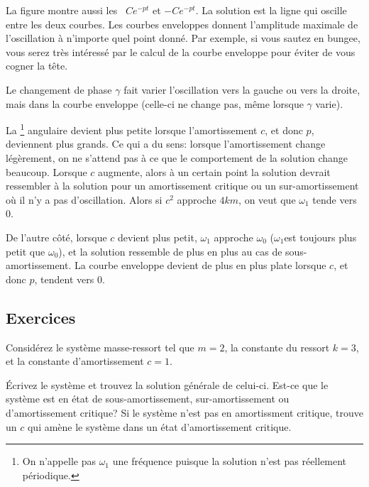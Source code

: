 
La figure montre aussi les~\emph{}
$C e^{-pt}$ et $-C e^{-pt}$.  La solution est la ligne qui oscille entre les deux courbes. Les courbes enveloppes donnent l'amplitude maximale de l'oscillation à n'importe quel point donné. Par exemple, si vous sautez en bungee, vous serez très intéressé par le calcul de la courbe enveloppe pour éviter de vous cogner la tête. 

Le changement de phase $\gamma$ fait varier l'oscillation vers la gauche ou vers la droite, mais dans la courbe enveloppe (celle-ci ne change pas, même lorsque $\gamma$
varie).


La 
\emph{}\footnote{On n'appelle pas $\omega_1$ une fréquence puisque la solution n'est pas réellement périodique.} angulaire devient plus petite lorsque l'amortissement 
$c$, et donc $p$, deviennent plus grands. Ce qui a du sens: lorsque l'amortissement change légèrement, on ne s'attend pas à ce que le comportement de la solution change beaucoup. Lorsque $c$ augmente,  alors à un certain point la solution devrait ressembler à la solution pour un amortissement critique ou un sur-amortissement où il n'y a pas d'oscillation. Alors si $c^2$ approche $4km$, on veut que $\omega_1$ tende vers 0.

De l'autre côté, lorsque $c$ devient plus petit, $\omega_1$ approche $\omega_0$
($\omega_1$est toujours plus petit que $\omega_0$), et la solution ressemble de plus en plus au cas de sous-amortissement. La courbe enveloppe devient de plus en plus plate lorsque $c$, et donc $p$, tendent vers 0.

\subsection{Exercices}

\begin{samepage}
\begin{exercise} \label{mv:ex1}
Considérez le système masse-ressort  tel que $m=2$, la constante du ressort $k=3$, et la constante d'amortissement $c=1$.
\begin{tasks}
\task Écrivez le système et trouvez la solution générale de celui-ci.
\task Est-ce que le système est en état de  sous-amortissement, sur-amortissement ou d'amortissement critique? 
\task Si le système n'est pas en amortissment critique, trouve un $c$ qui amène le système dans un état d'amortissement critique. 
\end{tasks}
\end{exercise}
\end{samepage}

